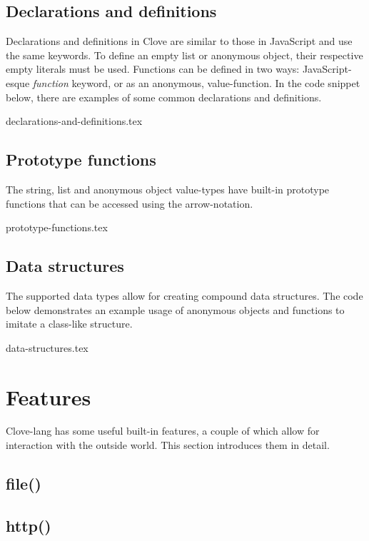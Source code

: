\documentclass[12pt,a4paper]{article}
\begin{document}
\subsection*{Declarations and definitions}
Declarations and definitions in Clove are similar to those in JavaScript and use the same keywords. To define an empty list or anonymous object, their respective empty literals must be used. Functions can be defined in two ways: JavaScript-esque \emph{function} keyword, or as an anonymous, value-function. In the code snippet below, there are examples of some common declarations and definitions.

{declarations-and-definitions.tex}



\subsection*{Prototype functions}
The string, list and anonymous object value-types have built-in prototype functions that can be accessed using the arrow-notation.

{prototype-functions.tex}



\subsection*{Data structures}
The supported data types allow for creating compound data structures. The code below demonstrates an example usage of anonymous objects and functions to imitate a class-like structure.

{data-structures.tex}









\section*{Features}
Clove-lang has some useful built-in features, a couple of which allow for interaction with the outside world. This section introduces them in detail.


\subsection*{file()}


\subsection*{http()}
\end{document}
